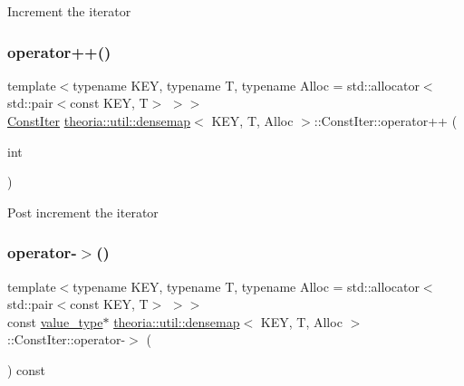 Increment the iterator \mbox{\label{classtheoria_1_1util_1_1densemap_1_1ConstIter_a8ca98e8a181d846c7c8412192f59da95}} 
\subsubsection{\texorpdfstring{operator++()}{operator++()}\hspace{0.1cm}{\footnotesize\ttfamily [2/2]}}
{\footnotesize\ttfamily template$<$typename K\+EY, typename T, typename Alloc = std\+::allocator$<$std\+::pair$<$const K\+E\+Y, T$>$ $>$$>$ \\
\hyperlink{classtheoria_1_1util_1_1densemap_1_1ConstIter}{Const\+Iter} \hyperlink{classtheoria_1_1util_1_1densemap}{theoria\+::util\+::densemap}$<$ K\+EY, T, Alloc $>$\+::Const\+Iter\+::operator++ (\begin{DoxyParamCaption}\item[{int}]{ }\end{DoxyParamCaption})\hspace{0.3cm}{\ttfamily [inline]}}

Post increment the iterator \mbox{\label{classtheoria_1_1util_1_1densemap_1_1ConstIter_a72db96ac5b14a045377b9b840a406d9a}} 
\subsubsection{\texorpdfstring{operator-\/$>$()}{operator->()}}
{\footnotesize\ttfamily template$<$typename K\+EY, typename T, typename Alloc = std\+::allocator$<$std\+::pair$<$const K\+E\+Y, T$>$ $>$$>$ \\
const \hyperlink{classtheoria_1_1util_1_1densemap_1_1ConstIter_a061fb76ecf5498d6033472fa66635d4a}{value\+\_\+type}$\ast$ \hyperlink{classtheoria_1_1util_1_1densemap}{theoria\+::util\+::densemap}$<$ K\+EY, T, Alloc $>$\+::Const\+Iter\+::operator-\/$>$ (\begin{DoxyParamCaption}{ }\end{DoxyParamCaption}) const\hspace{0.3cm}{\ttfamily [inline]}}

